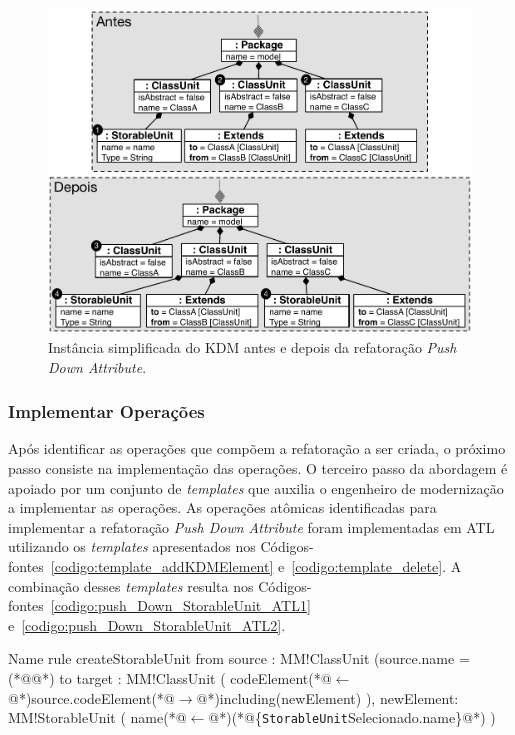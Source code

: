 \begin{figure}[h]
	\centering
	\caption{Instância simplificada do KDM antes e depois da refatoração \textit{Push Down Attribute}.}
	\label{fig:antes_e_depois_pushDown_StorableUnit}
	\includegraphics[scale=0.6]{images/pushDownStorableUnitAntesDepois2}
	\fautor
\end{figure}

\subsubsection{Implementar Operações}

Após identificar as operações que compõem a refatoração a ser criada, o próximo passo consiste na implementação das operações. O terceiro passo da abordagem é apoiado por um conjunto de \textit{templates} que auxilia o engenheiro de modernização a implementar as operações. As operações atômicas identificadas para implementar a refatoração \textit{Push Down Attribute} foram implementadas em ATL utilizando os \textit{templates} apresentados nos Códigos-fontes~\ref{codigo:template_addKDMElement} e~\ref{codigo:template_delete}. A combinação desses \textit{templates} resulta nos Códigos-fontes~\ref{codigo:push_Down_StorableUnit_ATL1} e~\ref{codigo:push_Down_StorableUnit_ATL2}.


\begin{codigo}[caption={[ATL representando a operação atômica \texttt{add}.] ATL representando a operação atômica \texttt{add}.},escapeinside={(*@}{@*)}, basicstyle=\footnotesize, label={codigo:push_Down_StorableUnit_ATL1}, language=ATL]{Name}
rule createStorableUnit {
	from
		source : MM!ClassUnit (source.name = (*@@*)
	to 
		target : MM!ClassUnit (
			codeElement(*@$\leftarrow$@*)source.codeElement(*@$\rightarrow$@*)including(newElement)
		),
		newElement: MM!StorableUnit (
			name(*@$\leftarrow$@*)(*@\{\texttt{StorableUnit}Selecionado.name\}@*)
		)
}
\end{codigo}

